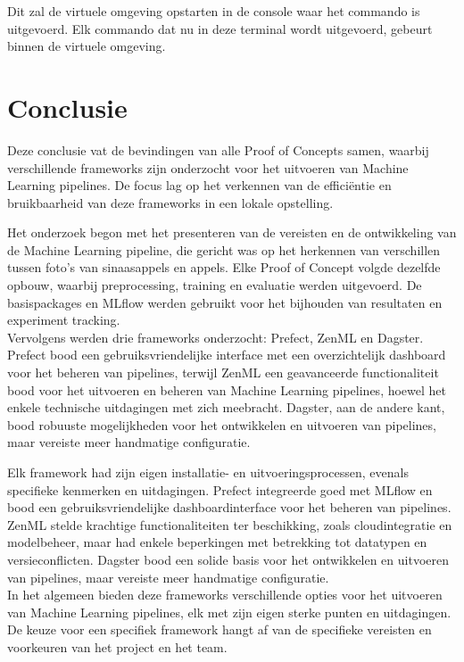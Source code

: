 Dit zal de virtuele omgeving opstarten in de console waar het commando is uitgevoerd. Elk commando dat nu in deze terminal wordt uitgevoerd, gebeurt binnen de virtuele omgeving.






\section{Conclusie}
Deze conclusie vat de bevindingen van alle Proof of Concepts samen, waarbij verschillende frameworks zijn onderzocht voor het uitvoeren van Machine Learning pipelines. De focus lag op het verkennen van de efficiëntie en bruikbaarheid van deze frameworks in een lokale opstelling.

Het onderzoek begon met het presenteren van de vereisten en de ontwikkeling van de Machine Learning pipeline, die gericht was op het herkennen van verschillen tussen foto's van sinaasappels en appels. Elke Proof of Concept volgde dezelfde opbouw, waarbij preprocessing, training en evaluatie werden uitgevoerd. De basispackages en MLflow werden gebruikt voor het bijhouden van resultaten en experiment tracking.\\

Vervolgens werden drie frameworks onderzocht: Prefect, ZenML en Dagster. Prefect bood een gebruiksvriendelijke interface met een overzichtelijk dashboard voor het beheren van pipelines, terwijl ZenML een geavanceerde functionaliteit bood voor het uitvoeren en beheren van Machine Learning pipelines, hoewel het enkele technische uitdagingen met zich meebracht. Dagster, aan de andere kant, bood robuuste mogelijkheden voor het ontwikkelen en uitvoeren van pipelines, maar vereiste meer handmatige configuratie.

Elk framework had zijn eigen installatie- en uitvoeringsprocessen, evenals specifieke kenmerken en uitdagingen. Prefect integreerde goed met MLflow en bood een gebruiksvriendelijke dashboardinterface voor het beheren van pipelines. ZenML stelde krachtige functionaliteiten ter beschikking, zoals cloudintegratie en modelbeheer, maar had enkele beperkingen met betrekking tot datatypen en versieconflicten. Dagster bood een solide basis voor het ontwikkelen en uitvoeren van pipelines, maar vereiste meer handmatige configuratie.\\

In het algemeen bieden deze frameworks verschillende opties voor het uitvoeren van Machine Learning pipelines, elk met zijn eigen sterke punten en uitdagingen. De keuze voor een specifiek framework hangt af van de specifieke vereisten en voorkeuren van het project en het team.